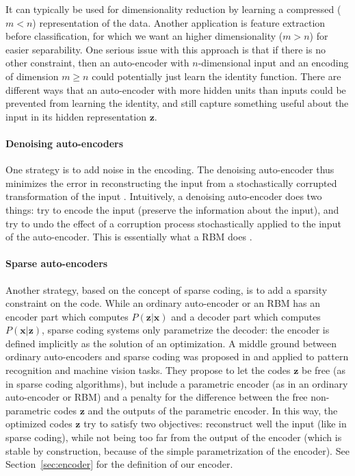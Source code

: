 \documentclass[a4paper,12pt,twoside]{report}
\newcommand{\secref}[1]{Section~\ref{#1}}
\newcommand{\x}{\mathbf{x}}
\newcommand{\z}{\mathbf{z}}
\begin{document}
It can typically be used for dimensionality reduction by learning a compressed ($m<n$) representation of the data. Another application is feature extraction before classification, for which we want an higher dimensionality ($m>n$) for easier separability. One serious issue with this approach is that if there is no other constraint, then an auto-encoder with $n$-dimensional input and an encoding of dimension $m \geq n$ could potentially just learn the identity function. There are different ways that an auto-encoder with more hidden units than inputs could be prevented from learning the identity, and still capture something useful about the input in its hidden representation $\z$.

\paragraph{Denoising auto-encoders}
One strategy is to add noise in the encoding. The denoising auto-encoder thus minimizes the error in reconstructing the input from a stochastically corrupted transformation of the input \cite{bengio2008denoisingAutoencoders}. Intuitively, a denoising auto-encoder does two things: try to encode the input (preserve the information about the input), and try to undo the effect of a corruption process stochastically applied to the input of the auto-encoder. This is essentially what a \gls{RBM} does \cite{hinton2002RBM}.

\paragraph{Sparse auto-encoders}
Another strategy, based on the concept of sparse coding, is to add a sparsity constraint on the code. While an ordinary auto-encoder or an \gls{RBM} has an encoder part which computes $P(\z|\x)$ and a decoder part which computes $P(\x|\z)$, sparse coding systems only parametrize the decoder: the encoder is defined implicitly as the solution of an optimization. A middle ground between ordinary auto-encoders and sparse coding was proposed in \cite{lecun2006stackedSparseAutoencoders, ranzato2007stackedSparseAutoencoders} and applied to pattern recognition and machine vision tasks. They propose to let the codes $\z$ be free (as in sparse coding algorithms), but include a parametric encoder (as in an ordinary auto-encoder or \gls{RBM}) and a penalty for the difference between the free non-parametric codes $\z$ and the outputs of the parametric encoder. In this way, the optimized codes $\z$ try to satisfy two objectives: reconstruct well the input (like in sparse coding), while not being too far from the output of the encoder (which is stable by construction, because of the simple parametrization of the encoder). See \secref{sec:encoder} for the definition of our encoder.
\end{document}
